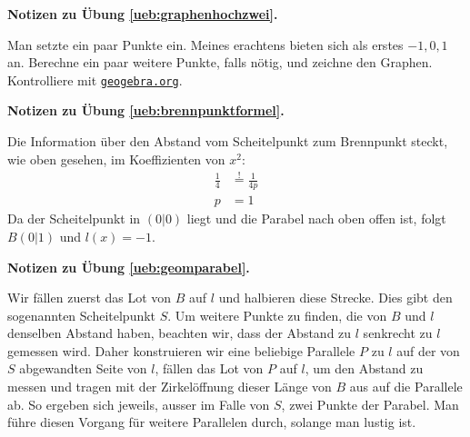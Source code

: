 \documentclass[%
11pt,%
twoside,%
titlepage,%
swissgerman,%
headsepline%
]{scrartcl}
\newcommand{\faReturnGray}{\textcolor{gray}{\faMailReply}} %
\newcommand{\geogebralink}{\href{https://www.geogebra.org/calculator}{\texttt{geogebra.org}}}
\theoremstyle{definition}
\theoremstyle{plain}
\newcommand{\concatueb}[1]{ueb:#1}%
\newcommand{\concatlsg}[1]{lsg:#1}%
\newenvironment{lsg}[1]{%
    \par\noindent\textbf{Notizen zu Übung \ref{\concatueb{#1}}.}%
    \label{\concatlsg{#1}} %
    \hfill\hyperref[\concatueb{#1}]{\faReturnGray}\par %
}{%
    \par%
}
\begin{document}
\begin{lsg}{graphenhochzwei}
    Man setzte ein paar Punkte ein. Meines erachtens bieten sich als erstes $-1,0,1$ an. Berechne ein paar weitere Punkte, falls nötig, und zeichne den Graphen. Kontrolliere mit \geogebralink.
\end{lsg}
\begin{lsg}{brennpunktformel}
    Die Information über den Abstand vom Scheitelpunkt zum Brennpunkt steckt, wie oben gesehen, im Koeffizienten von $x^2$:
    \begin{align*}
        \frac{1}{4} &\stackrel{!}{=} \frac{1}{4p}\tag{$\cdot p, \cdot 4$}\\
        p &= 1
    \end{align*}
    Da der Scheitelpunkt in $(0|0)$ liegt und die Parabel nach oben offen ist, folgt $B(0|1)$ und $l(x)=-1$.
\end{lsg}
\begin{lsg}{geomparabel}
    Wir fällen zuerst das Lot von $B$ auf $l$ und halbieren diese Strecke. Dies gibt den sogenannten Scheitelpunkt $S$. Um weitere Punkte zu finden, die von $B$ und $l$ denselben Abstand haben, beachten wir, dass der Abstand zu $l$ senkrecht zu $l$ gemessen wird. Daher konstruieren wir eine beliebige Parallele $P$ zu $l$ auf der von $S$ abgewandten Seite von $l$, fällen das Lot von $P$ auf $l$, um den Abstand zu messen und tragen mit der Zirkelöffnung dieser Länge von $B$ aus auf die Parallele ab. So ergeben sich jeweils, ausser im Falle von $S$, zwei Punkte der Parabel. Man führe diesen Vorgang für weitere Parallelen durch, solange man lustig ist.

\begin{center}
\end{center}

\end{lsg}
\end{document}
